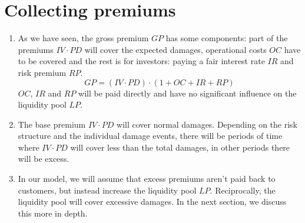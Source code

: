 \documentclass[runningheads,a4paper]{llncs}
\begin{document}
\section{Collecting premiums}
\begin{enumerate}
\item As we have seen, the gross premium $GP$ has some components: part of the premiums $IV \cdot PD$ will cover the 
expected damages, operational costs $OC$ have to be covered and the rest is for investors: paying a fair 
interest rate $IR$ and risk premium $RP$.
\begin{equation} \label{eq:GP2}
    GP = (IV \cdot PD) \cdot (1 + OC + IR + RP)
\end{equation}
$OC$, $IR$ and $RP$ will be paid directly and have no significant influence on the liquidity pool $LP$. 
\item The base premium $IV \cdot PD$ will cover normal damages. Depending on the risk structure and the individual
damage events, there will be periods of time where $IV \cdot PD$ will cover less than the total damages, in other
periods there will be excess.
\item In our model, we will assume that excess premiums aren't paid back to customers, but instead increase the 
liquidity pool $LP$. Reciprocally, the liquidity pool will cover excessive damages. In the next section, we 
discuss this more in depth.
\end{enumerate}
\end{document}
